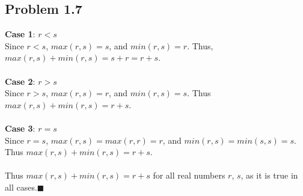 \documentclass{article}
\begin{document}
\subsection{Problem 1.7}
\textbf{Case 1}: $r<s$\\
Since $r<s$, $max(r,s)=s$, and $min(r,s)=r$. Thus, $max(r,s)+min(r,s)=s+r=r+s$.\\
\\
\textbf{Case 2}: $r>s$\\
Since $r>s$, $max(r,s)=r$, and $min(r,s)=s$. Thus $max(r,s)+min(r,s)=r+s$.\\
\\
\textbf{Case 3}: $r=s$\\
Since $r=s$, $max(r,s)=max(r,r)=r$, and $min(r,s)=min(s,s)=s$. Thus $max(r,s)+min(r,s)=r+s$.\\
\\
Thus $max(r,s)+min(r,s)=r+s$ for all real numbers $r$, $s$, as it is true in all cases.\hfill$\blacksquare$
\end{document}
